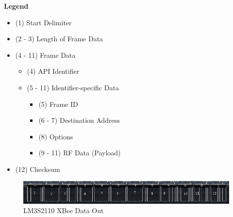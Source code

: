\documentclass[11pt, titlepage]{article}
\begin{document}
            \textbf{Legend}
            \begin{itemize}
                \item (1) Start Delimiter
                \item (2 - 3) Length of Frame Data
                \item (4 - 11) Frame Data
                    \begin{itemize}
                        \item (4) API Identifier
                        \item (5 - 11) Identifier-specific Data
                            \begin{itemize}
                                \item (5) Frame ID
                                \item (6 - 7) Destination Address
                                \item (8) Options
                                \item (9 - 11) RF Data (Payload)
                            \end{itemize}
                    \end{itemize}
                \item (12) Checksum
            \end{itemize}
            
            \FloatBarrier
            \begin{figure}[htbp]
                \centering
                \includegraphics[scale = 0.8]{Screenshots/2110_out.png}
                \caption{LM3S2110 XBee Data Out}
            \end{figure}
            \FloatBarrier
            
\end{document}
